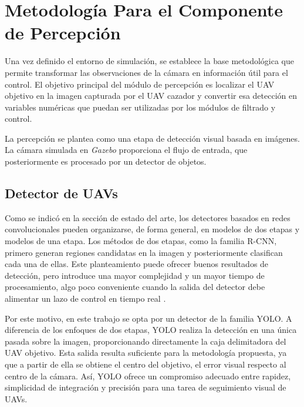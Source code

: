 \section{Metodología Para el Componente de Percepción}

Una vez definido el entorno de simulación, se establece la base metodológica que permite transformar las observaciones de la cámara en información útil para el control. El objetivo principal del módulo de percepción es localizar el UAV objetivo en la imagen capturada por el UAV cazador y convertir esa detección en variables numéricas que puedan ser utilizadas por los módulos de filtrado y control.

\vspace{0.3cm}

La percepción se plantea como una etapa de detección visual basada en imágenes. La cámara simulada en \textit{Gazebo} proporciona el flujo de entrada, que posteriormente es procesado por un detector de objetos.

\subsection{Detector de UAVs}

Como se indicó en la sección de estado del arte, los detectores basados en redes convolucionales pueden organizarse, de forma general, en modelos de dos etapas y modelos de una etapa. Los métodos de dos etapas, como la familia R-CNN, primero generan regiones candidatas en la imagen y posteriormente clasifican cada una de ellas. Este planteamiento puede ofrecer buenos resultados de detección, pero introduce una mayor complejidad y un mayor tiempo de procesamiento, algo poco conveniente cuando la salida del detector debe alimentar un lazo de control en tiempo real \cite{diffTwoStage, FunRcnn}.

\vspace{0.3cm}

Por este motivo, en este trabajo se opta por un detector de la familia YOLO. A diferencia de los enfoques de dos etapas, YOLO realiza la detección en una única pasada sobre la imagen, proporcionando directamente la caja delimitadora del UAV objetivo. Esta salida resulta suficiente para la metodología propuesta, ya que a partir de ella se obtiene el centro del objetivo, el error visual respecto al centro de la cámara. Así, YOLO ofrece un compromiso adecuado entre rapidez, simplicidad de integración y precisión para una tarea de seguimiento visual de UAVs.

